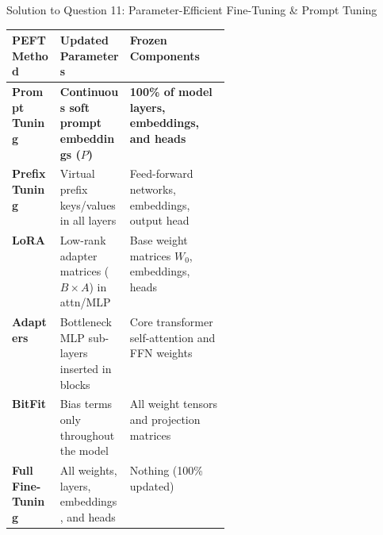\documentclass[11pt,a4paper]{article}
\begin{document}
\begin{solutionbox}{Solution to Question 11: Parameter-Efficient Fine-Tuning \& Prompt Tuning}
\begin{center}
\small
\begin{tabularx}{\linewidth}{l >{\raggedright\arraybackslash}p{0.32\linewidth} >{\raggedright\arraybackslash}X}
\toprule
\textbf{PEFT Method} & \textbf{Updated Parameters} & \textbf{Frozen Components} \\
\midrule
\textbf{Prompt Tuning} & \textbf{Continuous soft prompt embeddings ($P$)} & \textbf{100\% of model layers, embeddings, and heads} \\
\textbf{Prefix Tuning} & Virtual prefix keys/values in all layers & Feed-forward networks, embeddings, output head \\
\textbf{LoRA} & Low-rank adapter matrices ($B \times A$) in attn/MLP & Base weight matrices $W_0$, embeddings, heads \\
\textbf{Adapters} & Bottleneck MLP sub-layers inserted in blocks & Core transformer self-attention and FFN weights \\
\textbf{BitFit} & Bias terms only throughout the model & All weight tensors and projection matrices \\
\textbf{Full Fine-Tuning} & All weights, layers, embeddings, and heads & Nothing (100\% updated) \\
\bottomrule
\end{tabularx}
\end{center}


\end{solutionbox}
\end{document}
